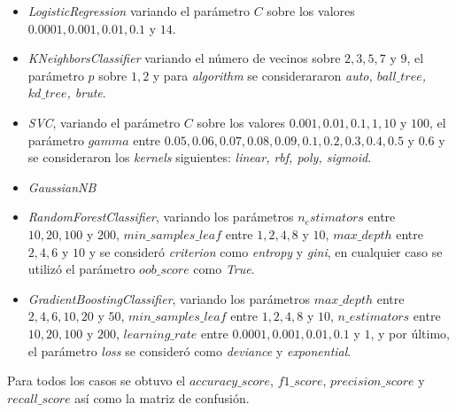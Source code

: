 \documentclass[6pt, twocolumn]{article}
\begin{document}
\begin{itemize}
\item \textit{LogisticRegression} variando el parámetro $C$ sobre los valores $0.0001, 0.001, 0.01, 0.1$ y $14$.
\item \textit{KNeighborsClassifier} variando el número de vecinos sobre $2, 3, 5, 7$ y $9$, el parámetro $p$ sobre $1, 2$ y para \textit{algorithm} se considerararon \textit{auto, $ball\_tree$, $kd\_tree$, brute}.
\item \textit{SVC}, variando el parámetro $C$ sobre los valores $0.001, 0.01, 0.1, 1, 10$ y $100$, el parámetro $gamma$ entre $0.05, 0.06, 0.07, 0.08, 0.09, 0.1, 0.2, 0.3, 0.4, 0.5$ y $0.6$ y se consideraron los \textit{kernels} siguientes: \textit{linear, rbf, poly, sigmoid}.
\item \textit{GaussianNB}
\item \textit{RandomForestClassifier}, variando los parámetros \textit{$n_estimators$} entre $10, 20, 100$ y $200$, \textit{$min\_samples\_leaf$} entre $1, 2, 4, 8$ y $10$, \textit{$max\_depth$} entre $2, 4, 6$ y $10$ y se consideró \textit{criterion} como \textit{entropy} y \textit{gini}, en cualquier caso se utilizó el parámetro \textit{$oob\_score$} como \textit{True}.
\item \textit{GradientBoostingClassifier}, variando los parámetros \textit{$max\_depth$} entre $2,4,6, 10, 20$ y $50$, \textit{$min\_samples\_leaf$} entre $1, 2, 4, 8$ y $10$, \textit{$n\_estimators$} entre $10, 20, 100$ y $200$, \textit{$learning\_rate$} entre $0.0001, 0.001, 0.01, 0.1$ y $1$, y por último, el parámetro \textit{loss} se consideró como \textit{deviance} y \textit{exponential}.
\end{itemize}
Para todos los casos se obtuvo el \textit{$accuracy\_score$}, \textit{$f1\_score$}, \textit{$precision\_score$} y \textit{$recall\_score$} así como la matriz de confusión.
\end{document}
